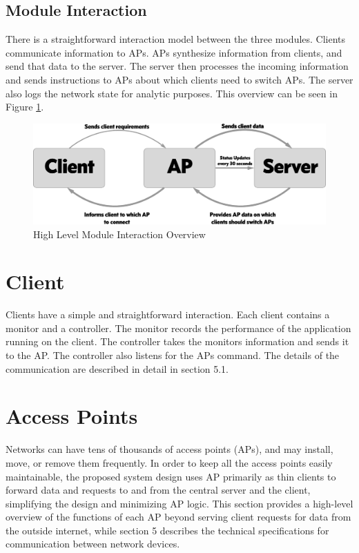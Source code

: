 \documentclass[10pt,journal,compsoc]{IEEEtran}
\begin{document}
		\subsection{Module Interaction}
		There is a straightforward interaction model between the three modules. Clients communicate information to APs. APs synthesize information from clients, and send that data to the server. The server then processes the incoming information and sends instructions to APs about which clients need to switch APs. The server also logs the network state for analytic purposes. This overview can be seen in Figure \ref{fig:overview}. 
		
        \begin{figure}
            \includegraphics[width=\linewidth]{overviewDiagram.png}
            \caption{High Level Module Interaction Overview}
            \label{fig:overview}
        \end{figure}
		
		
		\section{Client}
		Clients have a simple and straightforward interaction. Each client contains a monitor and a controller. The monitor records the performance of the application running on the client. The controller takes the monitors information and sends it to the AP. The controller also listens for the APs command. The details of the communication are described in detail in section 5.1.
		
		\section{Access Points}
		Networks can have tens of thousands of access points (APs), and may install, move, or remove them frequently. In order to keep all the access points easily maintainable, the proposed system design uses AP primarily as thin clients to forward data and requests to and from the central server and the client, simplifying the design and minimizing AP logic. This section provides a high-level overview of the functions of each AP beyond serving client requests for data from the outside internet, while section 5 describes the technical specifications for communication between network devices.
		
\end{document}
